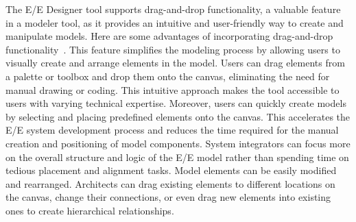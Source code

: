     The E/E Designer tool supports drag-and-drop functionality, a valuable feature in a modeler tool, as it provides an intuitive and user-friendly way to create and manipulate models. Here are some advantages of incorporating drag-and-drop functionality~\cite{askaripoor2023designer}.
    This feature simplifies the modeling process by allowing users to visually create and arrange elements in the model. Users can drag elements from a palette or toolbox and drop them onto the canvas, eliminating the need for manual drawing or coding. This intuitive approach makes the tool accessible to users with varying technical expertise. Moreover, users can quickly create models by selecting and placing predefined elements onto the canvas. This accelerates the E/E system development process and reduces the time required for the manual creation and positioning of model components. System integrators can focus more on the overall structure and logic of the E/E model rather than spending time on tedious placement and alignment tasks.
    Model elements can be easily modified and rearranged. Architects can drag existing elements to different locations on the canvas, change their connections, or even drag new elements into existing ones to create hierarchical relationships.
    

